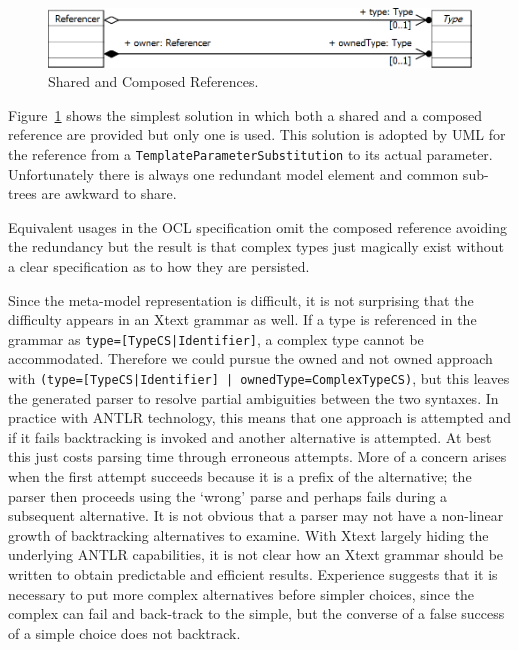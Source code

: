 \documentclass[runningheads,a4paper]{llncs}
\begin{document}
\begin{figure}
  \begin{center}
    \includegraphics[width=4.75in]{SiblingReference.png}
  \end{center}
  \caption{Shared and Composed References.}
  \label{fig:SiblingReference}
\end{figure}

Figure~\ref{fig:SiblingReference} shows the simplest solution in which both a shared and a composed reference are provided but only one is used. This solution is adopted by UML for the reference from a \verb+TemplateParameterSubstitution+ to its actual parameter. Unfortunately there is always one redundant model element and common sub-trees are awkward to share.

Equivalent usages in the OCL specification omit the composed reference avoiding the redundancy but the result is that complex types just magically exist without a clear specification as to how they are persisted.

Since the meta-model representation is difficult, it is not surprising that the difficulty appears in an Xtext grammar as well. If a type is referenced in the grammar as \verb+type=[TypeCS|Identifier]+, a complex type cannot be accommodated. Therefore we could pursue the owned and not owned approach with \verb+(type=[TypeCS|Identifier] | ownedType=ComplexTypeCS)+, but this leaves the generated parser to resolve partial ambiguities between the two syntaxes. In practice with ANTLR technology, this means that one approach is attempted and if it fails backtracking is invoked and another alternative is attempted. At best this just costs parsing time through erroneous attempts. More of a concern arises when the first attempt succeeds because it is a prefix of the alternative; the parser then proceeds using the `wrong' parse and perhaps fails during a subsequent alternative. It is not obvious that a parser may not have a non-linear growth of backtracking alternatives to examine. With Xtext largely hiding the underlying ANTLR capabilities, it is not clear how an Xtext grammar should be written to obtain predictable and efficient results. Experience suggests that it is necessary to put more complex alternatives before simpler choices, since the complex can fail and back-track to the simple, but the converse of a false success of a simple choice does not backtrack.
\end{document}
